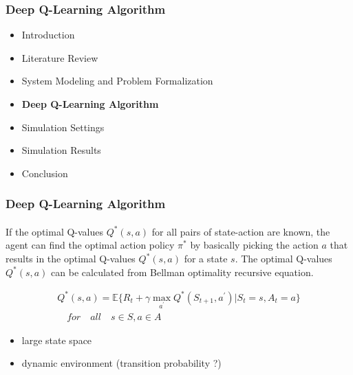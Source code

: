 \documentclass[aspectratio=169]{beamer}
\begin{document}
\begin{frame}
\frametitle{Deep Q-Learning Algorithm}
\begin{itemize}
  \item  Introduction
  \item Literature Review
  \item System Modeling and Problem Formalization
  \item {\color{cor1}\textbf{Deep Q-Learning Algorithm}}
  \item Simulation Settings
  \item Simulation Results
  \item Conclusion
\end{itemize}

\end{frame}
\begin{frame}
\frametitle{Deep Q-Learning Algorithm}
\framesubtitle{}

If the optimal Q-values $Q^*(s,a)$ for all pairs of state-action are known, the agent can find the optimal action policy $\pi^*$ by basically picking the action $a$ that results in the optimal Q-values $Q^*(s,a)$ for a state $s$. The optimal Q-values $Q^*(s,a)$ can be calculated from Bellman optimality recursive equation. 

\begin{equation}
\begin{aligned}
     Q^*(s, a)=\mathbb{\mathbb{E}}\{R_t+\gamma \underset{a^{\prime}}{\operatorname{max}}Q^*(S_{t+1}, a^{\prime})| S_t=s, A_t=a\} \\
    \quad for \quad all \quad s\in S, a \in A
\end{aligned}
\end{equation}
\begin{itemize}
    \item large state space
    \item dynamic environment (transition probability ?) 
\end{itemize}
\end{frame}
\end{document}
